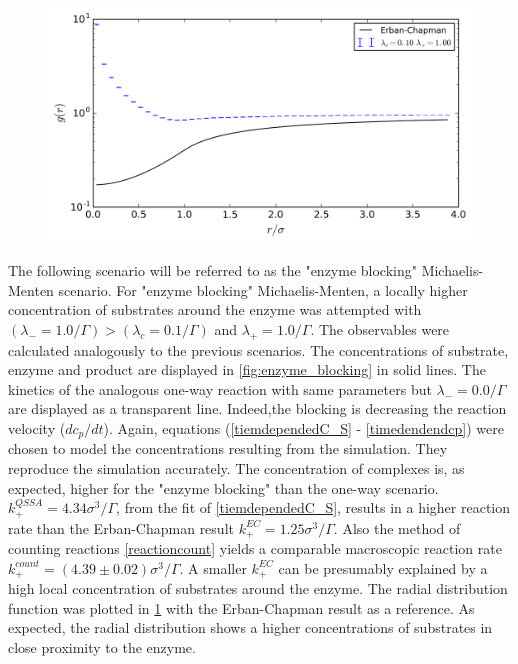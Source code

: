 \documentclass[
  a4paper,BCOR10mm,twoside,
  headsepline,footsepline,%
  fleqn,openbib
]{scrbook}
\begin{document}
\begin{figure}[h]
  \centering
  \includegraphics[width=\textwidth]{./data/limit-radial-highlocalconcentration.png}
  \captionsetup{width=\linewidth}
  \label{fig:diffusion1_limit-radial_local concentration}
\end{figure}
The following scenario will be referred to as the "enzyme blocking" Michaelis-Menten scenario. For "enzyme blocking" Michaelis-Menten, a locally higher concentration of substrates around the enzyme was attempted with $(\lambda_{-}=1.0/\Gamma )> (\lambda_c=0.1/\Gamma)$ and $\lambda_+=1.0/\Gamma$. The observables were calculated analogously to the previous scenarios. The concentrations of substrate, enzyme and product are displayed in \cref{fig:enzyme_blocking} in solid lines. The kinetics of the analogous one-way reaction with same parameters but $\lambda_{-}=0.0/\Gamma $ are displayed as a transparent line. Indeed,the blocking is decreasing the reaction velocity ($dc_p/dt$). Again, equations (\ref{tiemdependedC_S} - \ref{timedendendcp})  were chosen to model the concentrations resulting from the simulation. They reproduce the simulation accurately. The concentration of complexes is, as expected, higher for the "enzyme blocking" than the one-way scenario. $k^{QSSA}_{+}=4.34 \sigma^3/\Gamma$, from the fit of \cref{tiemdependedC_S}, results in a higher reaction rate than the Erban-Chapman result $k^{EC}_{+}=1.25 \sigma^3/\Gamma$. Also the method of counting reactions \cref{reactioncount} yields a comparable macroscopic reaction rate $k^{count}_{+}=(4.39\pm0.02) \sigma^3/\Gamma$. A smaller $k^{EC}_{+}$ can be presumably explained by a high local concentration of substrates around the enzyme. The radial distribution function was plotted in \cref{fig:diffusion1_limit-radial_local concentration} with the Erban-Chapman result as a reference. As expected, the radial distribution shows a higher concentrations of substrates in close proximity to the enzyme. 
\end{document}
